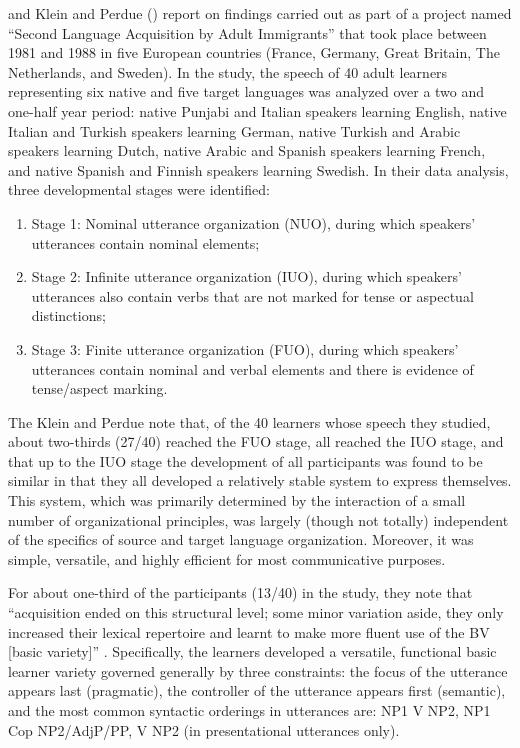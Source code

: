 \documentclass[output=paper,colorlinks,citecolor=brown]{langscibook}
\begin{document}
\citet{Perdue_v1_1993, Perdue_v2_1993} and Klein and Perdue (\citeyear{KleinPerdue1992,KleinPerdue1997}) report on findings carried out as part of a project named “Second Language Acquisition by Adult Immigrants” that took place between 1981 and 1988 in five European countries (France, Germany, Great Britain, The Netherlands, and Sweden). In the study, the speech of 40 adult learners representing six native and five target languages was analyzed over a two and one-half year period: native Punjabi and Italian speakers learning English, native Italian and Turkish speakers learning German, native Turkish and Arabic speakers learning Dutch, native Arabic and Spanish speakers learning French, and native Spanish and Finnish speakers learning Swedish. In their data analysis, three developmental stages were identified:

\begin{enumerate}
    \item Stage 1: Nominal utterance organization (NUO), during which speakers' utterances contain nominal elements;
    \item Stage 2: Infinite utterance organization (IUO), during which speakers' utterances also contain verbs that are not marked for tense or aspectual distinctions;
    \item Stage 3: Finite utterance organization (FUO), during which speakers' utterances contain nominal and verbal elements and there is evidence of tense/aspect marking.
\end{enumerate}

The Klein and Perdue note that, of the 40 learners whose speech they studied, about two-thirds (27/40) reached the FUO stage, all reached the IUO stage, and that up to the IUO stage the development of all participants was found to be similar in that they all developed a relatively stable system to express themselves. This system, which was primarily determined by the interaction of a small number of organizational principles, was largely (though not totally) independent of the specifics of source and target language organization. Moreover, it was simple, versatile, and highly efficient for most communicative purposes.

For about one-third of the participants (13/40) in the study, they note that “acquisition ended on this structural level; some minor variation aside, they only increased their lexical repertoire and learnt to make more fluent use of the BV [basic variety]” \citep[303]{KleinPerdue1997}. Specifically, the learners developed a versatile, functional basic learner variety governed generally by three constraints: the focus of the utterance appears last (pragmatic), the controller of the utterance appears first (semantic), and the most common syntactic orderings in utterances are: NP1 V NP2, NP1 Cop NP2/AdjP/PP, V NP2 (in presentational utterances only).
\end{document}
